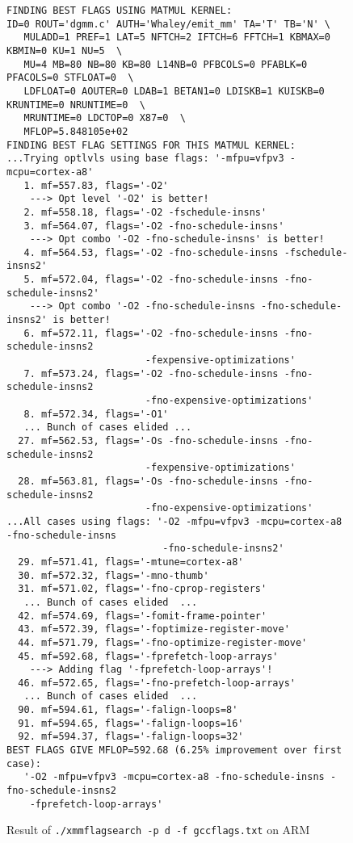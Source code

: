\documentclass[11pt]{article}
\begin{document}
\begin{figure}[p]
\begin{footnotesize}
\begin{verbatim}
FINDING BEST FLAGS USING MATMUL KERNEL:
ID=0 ROUT='dgmm.c' AUTH='Whaley/emit_mm' TA='T' TB='N' \
   MULADD=1 PREF=1 LAT=5 NFTCH=2 IFTCH=6 FFTCH=1 KBMAX=0 KBMIN=0 KU=1 NU=5  \
   MU=4 MB=80 NB=80 KB=80 L14NB=0 PFBCOLS=0 PFABLK=0 PFACOLS=0 STFLOAT=0  \
   LDFLOAT=0 AOUTER=0 LDAB=1 BETAN1=0 LDISKB=1 KUISKB=0 KRUNTIME=0 NRUNTIME=0  \
   MRUNTIME=0 LDCTOP=0 X87=0  \
   MFLOP=5.848105e+02
FINDING BEST FLAG SETTINGS FOR THIS MATMUL KERNEL:
...Trying optlvls using base flags: '-mfpu=vfpv3 -mcpu=cortex-a8'
   1. mf=557.83, flags='-O2'
    ---> Opt level '-O2' is better!
   2. mf=558.18, flags='-O2 -fschedule-insns'
   3. mf=564.07, flags='-O2 -fno-schedule-insns'
    ---> Opt combo '-O2 -fno-schedule-insns' is better!
   4. mf=564.53, flags='-O2 -fno-schedule-insns -fschedule-insns2'
   5. mf=572.04, flags='-O2 -fno-schedule-insns -fno-schedule-insns2'
    ---> Opt combo '-O2 -fno-schedule-insns -fno-schedule-insns2' is better!
   6. mf=572.11, flags='-O2 -fno-schedule-insns -fno-schedule-insns2 
                        -fexpensive-optimizations'
   7. mf=573.24, flags='-O2 -fno-schedule-insns -fno-schedule-insns2 
                        -fno-expensive-optimizations'
   8. mf=572.34, flags='-O1'
   ... Bunch of cases elided ...
  27. mf=562.53, flags='-Os -fno-schedule-insns -fno-schedule-insns2 
                        -fexpensive-optimizations'
  28. mf=563.81, flags='-Os -fno-schedule-insns -fno-schedule-insns2 
                        -fno-expensive-optimizations'
...All cases using flags: '-O2 -mfpu=vfpv3 -mcpu=cortex-a8 -fno-schedule-insns
                           -fno-schedule-insns2'
  29. mf=571.41, flags='-mtune=cortex-a8'
  30. mf=572.32, flags='-mno-thumb'
  31. mf=571.02, flags='-fno-cprop-registers'
   ... Bunch of cases elided  ...
  42. mf=574.69, flags='-fomit-frame-pointer'
  43. mf=572.39, flags='-foptimize-register-move'
  44. mf=571.79, flags='-fno-optimize-register-move'
  45. mf=592.68, flags='-fprefetch-loop-arrays'
    ---> Adding flag '-fprefetch-loop-arrays'!
  46. mf=572.65, flags='-fno-prefetch-loop-arrays'
   ... Bunch of cases elided  ...
  90. mf=594.61, flags='-falign-loops=8'
  91. mf=594.65, flags='-falign-loops=16'
  92. mf=594.37, flags='-falign-loops=32'
BEST FLAGS GIVE MFLOP=592.68 (6.25% improvement over first case):
   '-O2 -mfpu=vfpv3 -mcpu=cortex-a8 -fno-schedule-insns -fno-schedule-insns2 
    -fprefetch-loop-arrays'
\end{verbatim}
\end{footnotesize}
\caption{Result of {\tt ./xmmflagsearch -p d -f gccflags.txt} on ARM}
\label{fig-flagsrch}
\end{figure}
\end{document}
